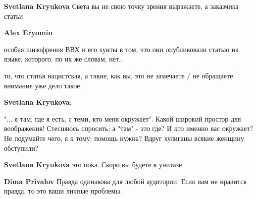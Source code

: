 \begin{itemize}
\begin{itemize}
 
\textbf{Svetlana Kryukova} Света вы не свою точку зрения выражаете, а заказчика статьи

 
\textbf{Alex Eryomin} 

особая шизофрения ВВХ и его хунты в том, что они опубликовали статью на языке,
которого, по их же словам, нет..

то, что статья нацистская, а такие, как вы, это не замечаете / не обращаете
внимание уже дело такое..


 
\textbf{Svetlana Kryukova}: 

"... я там, где я есть, с теми, кто меня окружает". Какой широкий простор для
воображения! Стесняюсь спросить: а "там" - это где? И кто именно вас окружает?
Не подумайте чего, я к тому: помощь нужна? Вдруг хулиганы всякие женщину
обступили?


 
\textbf{Svetlana Kryukova} это пока. Скоро вы будете в унитазе

 
\textbf{Dima Privalov} Правда одинакова для любой аудитории. Если вам не нравится правда, то это ваши личные проблемы.

 

\end{itemize}
\end{itemize}
